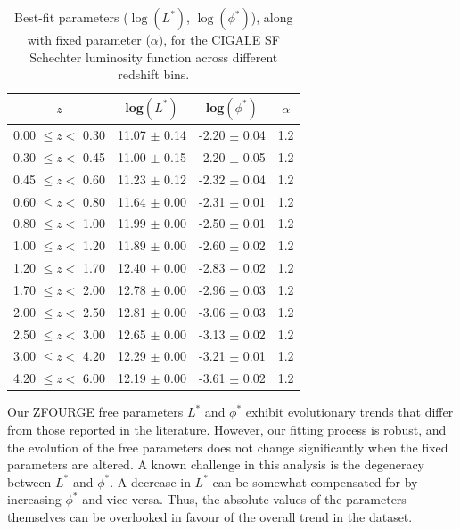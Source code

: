 \begin{table}
    \caption{Best-fit parameters ($\log(L^*)$, $\log(\phi^*)$), along with fixed parameter ($\alpha$), for the CIGALE SF Schechter luminosity function across different redshift bins.}
    \label{Tab: Param Evo SF}
    \begin{center}
    \begin{tabular}{cccc}
        \toprule
        $z$ & log$(L^{*})$ & log$(\phi^{*})$ & $\alpha$ \\
        \hline
        0.00 $\leq z <$ 0.30 & 11.07 $\pm$ 0.14 & -2.20 $\pm$ 0.04 & 1.2 \\
        0.30 $\leq z <$ 0.45 & 11.00 $\pm$ 0.15 & -2.20 $\pm$ 0.05 & 1.2 \\
        0.45 $\leq z <$ 0.60 & 11.23 $\pm$ 0.12 & -2.32 $\pm$ 0.04 & 1.2 \\
        0.60 $\leq z <$ 0.80 & 11.64 $\pm$ 0.00 & -2.31 $\pm$ 0.01 & 1.2 \\
        0.80 $\leq z <$ 1.00 & 11.99 $\pm$ 0.00 & -2.50 $\pm$ 0.01 & 1.2 \\
        1.00 $\leq z <$ 1.20 & 11.89 $\pm$ 0.00 & -2.60 $\pm$ 0.02 & 1.2 \\
        1.20 $\leq z <$ 1.70 & 12.40 $\pm$ 0.00 & -2.83 $\pm$ 0.02 & 1.2 \\
        1.70 $\leq z <$ 2.00 & 12.78 $\pm$ 0.00 & -2.96 $\pm$ 0.03 & 1.2 \\
        2.00 $\leq z <$ 2.50 & 12.81 $\pm$ 0.00 & -3.06 $\pm$ 0.03 & 1.2 \\
        2.50 $\leq z <$ 3.00 & 12.65 $\pm$ 0.00 & -3.13 $\pm$ 0.02 & 1.2 \\
        3.00 $\leq z <$ 4.20 & 12.29 $\pm$ 0.00 & -3.21 $\pm$ 0.01 & 1.2 \\
        4.20 $\leq z <$ 6.00 & 12.19 $\pm$ 0.00 & -3.61 $\pm$ 0.02 & 1.2 \\   
        \bottomrule
    \end{tabular}
    \end{center}
\end{table}

Our ZFOURGE free parameters $L^{*}$ and $\phi^{*}$ exhibit evolutionary trends that differ from those reported in the literature. However, our fitting process is robust, and the evolution of the free parameters does not change significantly when the fixed parameters are altered. A known challenge in this analysis is the degeneracy between $L^{*}$ and $\phi^{*}$. A decrease in $L^{*}$ can be somewhat compensated for by increasing $\phi^{*}$ and vice-versa. Thus, the absolute values of the parameters themselves can be overlooked in favour of the overall trend in the dataset. 

